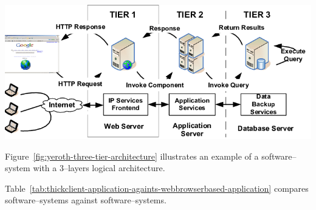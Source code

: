 \begin{center}
\includegraphics[scale=0.39]{images/yeroth-three-tier-architecture.png}
\label{fig:yeroth-three-tier-architecture}
\end{center}

Figure~\ref{fig:yeroth-three-tier-architecture}
illustrates an example of a \webbrowserbased
software--system with a $3$--layers
logical architecture.

Table~\ref{tab:thickclient-application-againts-webbrowserbased-application}
compares \thickclient software--systems against
\webbrowserbased software--systems.


\newpage



